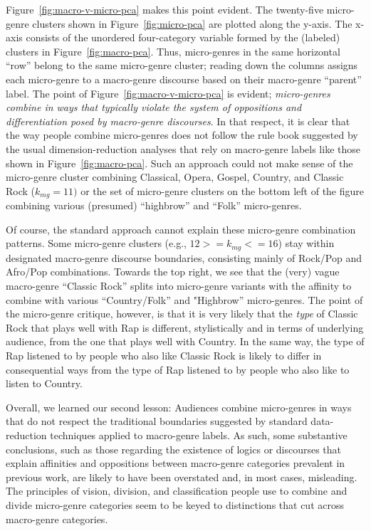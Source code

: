  Figure~\ref{fig:macro-v-micro-pca} makes this point evident. The twenty-five micro-genre clusters shown in Figure~\ref{fig:micro-pca} are plotted along the y-axis. The x-axis consists of the unordered four-category variable formed by the (labeled) clusters in Figure~\ref{fig:macro-pca}. Thus, micro-genres in the same horizontal ``row'' belong to the same micro-genre cluster; reading down the columns assigns each micro-genre to a macro-genre discourse based on their macro-genre ``parent'' label. The point of Figure~\ref{fig:macro-v-micro-pca} is evident; {\em micro-genres combine in ways that typically violate the system of oppositions and differentiation posed by macro-genre discourses}. In that respect, it is clear that the way people combine micro-genres does not follow the rule book suggested by the usual dimension-reduction analyses that rely on macro-genre labels like those shown in Figure~\ref{fig:macro-pca}. Such an approach could not make sense of the micro-genre cluster combining Classical, Opera, Gospel, Country, and Classic Rock ($k_{mg}=11)$ or the set of micro-genre clusters on the bottom left of the figure combining various (presumed) ``highbrow'' and ``Folk'' micro-genres. 
 
 Of course, the standard approach cannot explain these micro-genre combination patterns. Some micro-genre clusters (e.g., $12 >=k_{mg}<=16$) stay within designated macro-genre discourse boundaries, consisting mainly of Rock/Pop and Afro/Pop combinations. Towards the top right, we see that the (very) vague macro-genre ``Classic Rock'' splits into micro-genre variants with the affinity to combine with various ``Country/Folk'' and "Highbrow'' micro-genres. The point of the micro-genre critique, however, is that it is very likely that the {\em type} of Classic Rock that plays well with Rap is different, stylistically and in terms of underlying audience, from the one that plays well with Country. In the same way, the type of Rap listened to by people who also like Classic Rock is likely to differ in consequential ways from the type of Rap listened to by people who also like to listen to Country. 

 Overall, we learned our second lesson: Audiences combine micro-genres in ways that do not respect the traditional boundaries suggested by standard data-reduction techniques applied to macro-genre labels. As such, some substantive conclusions, such as those regarding the existence of logics or discourses that explain affinities and oppositions between macro-genre categories prevalent in previous work, are likely to have been overstated and, in most cases, misleading. The principles of vision, division, and classification people use to combine and divide micro-genre categories seem to be keyed to distinctions that cut across macro-genre categories. 

